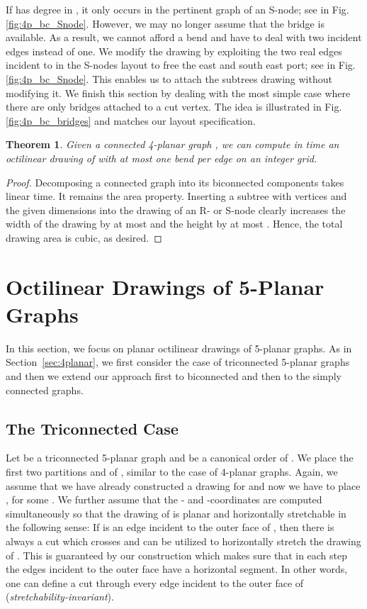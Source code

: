 \documentclass[a4paper,twoside,11pt]{article}
\newtheorem{theorem}{Theorem}
\begin{document}
If  has degree  in , it only occurs in the pertinent
graph of an S-node; see  in Fig.\ref{fig:4p_bc_Snode}. However,
we may no longer assume that the bridge is available. As a result,
we cannot afford a bend and have to deal with two incident edges
instead of one. We modify the drawing by exploiting the two real
edges incident to  in the S-nodes layout to free the east and
south east port; see  in Fig.\ref{fig:4p_bc_Snode}. This
enables us to attach the subtrees drawing without modifying it. We
finish this section by dealing with the most simple case where there
are only bridges attached to a cut vertex. The idea is illustrated
in Fig.\ref{fig:4p_bc_bridges} and matches our layout specification.

\begin{theorem}
Given a connected 4-planar graph , we can compute in  time
an octilinear drawing of  with at most one bend per edge on an
 integer grid. \label{thm:4planarconnected}
\end{theorem}
\begin{proof}
Decomposing a connected graph into its biconnected components takes
linear time. It remains the area property. Inserting a subtree with
 vertices and the given dimensions into the drawing of an R- or
S-node clearly increases the width of the drawing by at most
 and the height by at most . Hence, the total drawing
area is cubic, as desired.
\end{proof}


\section{Octilinear Drawings of 5-Planar Graphs}
\label{sec:5planar}


In this section, we focus on planar octilinear drawings of 5-planar
graphs. As in Section~\ref{sec:4planar}, we first consider the case
of triconnected 5-planar graphs and then we extend our approach
first to biconnected and then to the simply connected graphs.

\subsection{The Triconnected Case}
\label{sec:5tricon}


Let  be a triconnected 5-planar graph and  be a canonical order of . We place the first two
partitions  and  of , similar to the case of 4-planar
graphs. Again, we assume that we have already constructed a drawing
for  and now we have to place , for some
. We further assume that the - and
-coordinates are computed simultaneously so that the drawing of
 is planar and horizontally stretchable in the following
sense: If  is an edge incident to the outer face
of , then there is always a cut which crosses  and can
be utilized to horizontally stretch the drawing of . This
is guaranteed by our construction which makes sure that in each step
the edges incident to the outer face have a horizontal segment. In
other words, one can define a cut through every edge incident to the
outer face of  (\emph{stretchability-invariant}).
\end{document}
